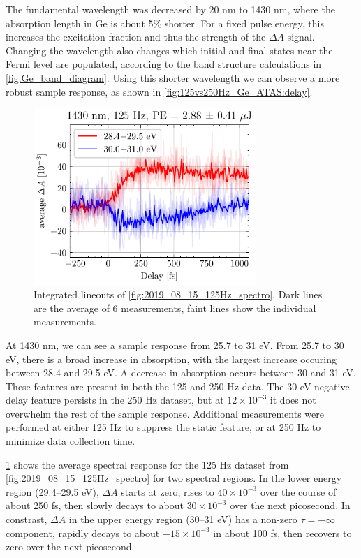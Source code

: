 The fundamental wavelength was decreased by 20 nm to 1430 nm, where the absorption length in Ge is about 5\% shorter. For a fixed pulse energy, this increases the excitation fraction and thus the strength of the $\Delta A$ signal. Changing the wavelength also changes which initial and final states near the Fermi level are populated, according to the band structure calculations in \cref{fig:Ge_band_diagram}. Using this shorter wavelength we can observe a more robust sample response, as shown in \cref{fig:125vs250Hz_Ge_ATAS:delay}.

\begin{figure}
	\centering
	\includegraphics[width=0.75\textwidth]{figures/chap4/Delay123456_1430nm_125Hz_2p88uJ_AvgBands.pdf}
	\caption{Integrated lineouts of \cref{fig:2019_08_15_125Hz_spectro}. Dark lines are the average of 6 measurements, faint lines show the individual measurements.}
	\label{fig:Delay123456_1430nm_125Hz_2p88uJ_AvgBands}
\end{figure}

At 1430 nm, we can see a sample response from 25.7 to 31 eV. From 25.7 to 30 eV, there is a broad increase in absorption, with the largest increase occuring between 28.4 and 29.5 eV. A decrease in absorption occurs between 30 and 31 eV. These features are present in both the 125 and 250 Hz data. The 30 eV negative delay feature persists in the 250 Hz dataset, but at $12 \times 10^{-3}$ it does not overwhelm the rest of the sample response. Additional measurements were performed at either 125 Hz to suppress the static feature, or at 250 Hz to minimize data collection time.

\cref{fig:Delay123456_1430nm_125Hz_2p88uJ_AvgBands} shows the average spectral response for the 125 Hz dataset from \cref{fig:2019_08_15_125Hz_spectro} for two spectral regions. In the lower energy region (29.4--29.5 eV), $\Delta A$ starts at zero, rises to $40 \times 10^{-3}$ over the course of about 250 fs, then slowly decays to about $30 \times 10^{-3}$ over the next picosecond. In constrast, $\Delta A$ in the upper energy region (30--31 eV) has a non-zero $\tau=-\infty$ component, rapidly decays to about $-15 \times 10^{-3}$ in about 100 fs, then recovers to zero over the next picosecond.

